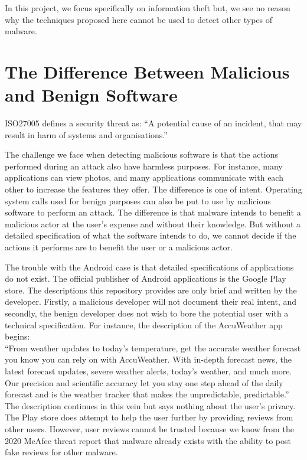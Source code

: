 In this project, we focus specifically on information theft but, we see no reason why the techniques proposed here cannot be used to detect other types of malware.

\section{The Difference Between Malicious and Benign Software}

ISO27005 defines a security threat as: ``A potential cause of an incident, that may result in harm of systems and organisations.''

The challenge we face when detecting malicious software is that the actions performed during an attack also have harmless purposes.  For instance, many applications can view photos, and many applications communicate with each other to increase the features they offer.  The difference is one of intent.  Operating system calls used for benign purposes can also be put to use by malicious software to perform an attack.  The difference is that malware intends to benefit a malicious actor at the user's expense and without their knowledge.  But without a detailed specification of what the software intends to do, we cannot decide if the actions it performs are to benefit the user or a malicious actor.

The trouble with the Android case is that detailed specifications of applications do not exist. The official publisher of Android applications is the Google Play store.  The descriptions this repository provides are only brief and written by the developer.  Firstly, a malicious developer will not document their real intent, and secondly, the benign developer does not wish to bore the potential user with a technical specification.  For instance, the description of the AccuWeather app begins:\\

``From weather updates to today's temperature, get the accurate weather forecast you know you can rely on with AccuWeather. With in-depth forecast news, the latest forecast updates, severe weather alerts, today's weather, and much more. Our precision and scientific accuracy let you stay one step ahead of the daily forecast and is the weather tracker that makes the unpredictable, predictable.''\\

The description continues in this vein but says nothing about the user's privacy. The Play store does attempt to help the user further by providing reviews from other users. However, user reviews cannot be trusted because we know from the 2020 McAfee threat report \cite{McAfeeMobileThreatReport} that malware already exists with the ability to post fake reviews for other malware.

